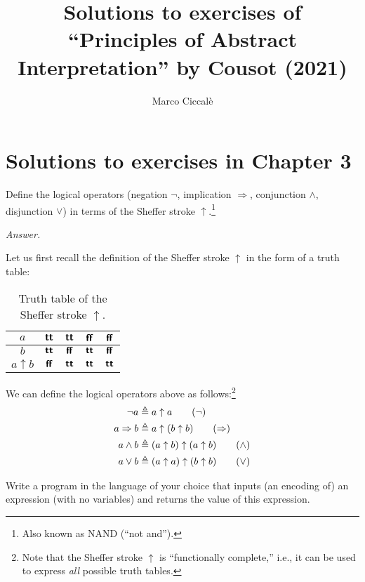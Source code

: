 \documentclass[10pt,justified,nofonts]{tufte-handout}
\title{Solutions to exercises of ``Principles of Abstract Interpretation'' by Cousot (2021)}
\author{Marco Ciccal{\`{e}}}
\newenvironment{exercise}[1]{%
  \IfBlankTF{#1}
    {\renewcommand{\theexerciseinner}{\unskip}}
    {\renewcommand\theexerciseinner{#1}}%
  \exerciseinner
}{\endexerciseinner}
\newenvironment{answer}[0]{%
  \par\pushQED{\qed}%
  \renewcommand\qedsymbol{$\Box$}%
  \noindent\textit{Answer.}%
  \hspace{.5em}%
}{\popQED\par}
\renewcommand{\implies}
  {\ensuremath{\Rightarrow}}
\newcommand{\ttrue}
  {\ensuremath{\textbf{\textsf{tt}}}}
\newcommand{\ffalse}
  {\ensuremath{\textbf{\textsf{ff}}}}
\newcommand{\isDefAs}
  {\ensuremath{\triangleq}}
\begin{document}
%
\maketitle
%
\tableofcontents
%
\section{Solutions to exercises in Chapter 3}
%
\begin{exercise}{3.6}
  Define the logical operators (negation $\neg$, implication
  $\implies$, conjunction $\wedge$, disjunction $\vee$) in terms of
  the Sheffer stroke $\uparrow$.\footnote{Also known as NAND (``not and'').}
\end{exercise}
%
\begin{answer}
  Let us first recall the definition of the Sheffer stroke $\uparrow$
  in the form of a truth table:
  
  \begin{table}
    \centering
    \caption{Truth table of the Sheffer stroke $\uparrow$.}
    \begin{tabular}{c|c|c|c|c}
      $a$ & $\ttrue$ & $\ttrue$ & $\ffalse$ & $\ffalse$\\\hline
      $b$ & $\ttrue$ & $\ffalse$ & $\ttrue$ & $\ffalse$\\\hline
      $a \uparrow b$ & $\ffalse$ & $\ttrue$ & $\ttrue$ & $\ttrue$
    \end{tabular}
  \end{table}
  
  \noindent We can define the logical operators above as
  follows:\footnote{Note that the Sheffer stroke $\uparrow$ is
    ``functionally complete,'' i.e., it can be used to express
    \emph{all} possible truth tables.}
  \begin{align*}
          \neg a &\isDefAs a \uparrow a\tag{$\neg$}\\
    a \implies b &\isDefAs a \uparrow (b \uparrow b)\tag{$\implies$}\\
    a   \wedge b &\isDefAs (a \uparrow b) \uparrow (a \uparrow b)\tag{$\wedge$}\\
    a     \vee b &\isDefAs (a \uparrow a) \uparrow (b \uparrow b)\tag{$\vee$}
  \end{align*}
\end{answer}
%
\begin{exercise}{3.7}
  Write a program in the language of your choice that inputs (an
  encoding of) an expression (with no variables) and returns the value
  of this expression.
\end{exercise}
\end{document}
